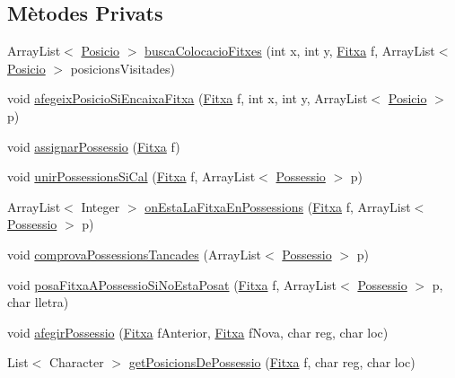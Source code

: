 \subsection*{Mètodes Privats}
\begin{DoxyCompactItemize}
\item 
Array\+List$<$ \mbox{\hyperlink{class_posicio}{Posicio}} $>$ \mbox{\hyperlink{class_tauler_a80439ab819e497bca329ee0ac1b0f298}{busca\+Colocacio\+Fitxes}} (int x, int y, \mbox{\hyperlink{class_fitxa}{Fitxa}} f, Array\+List$<$ \mbox{\hyperlink{class_posicio}{Posicio}} $>$ posicions\+Visitades)
\item 
void \mbox{\hyperlink{class_tauler_ab373a984846631d85aaab3bee1da1781}{afegeix\+Posicio\+Si\+Encaixa\+Fitxa}} (\mbox{\hyperlink{class_fitxa}{Fitxa}} f, int x, int y, Array\+List$<$ \mbox{\hyperlink{class_posicio}{Posicio}} $>$ p)
\item 
void \mbox{\hyperlink{class_tauler_af7c318026f6fb05db78e0b1ed2e8d3b6}{assignar\+Possessio}} (\mbox{\hyperlink{class_fitxa}{Fitxa}} f)
\item 
void \mbox{\hyperlink{class_tauler_acc18f6c54b9a7c0748a20a2090c76252}{unir\+Possessions\+Si\+Cal}} (\mbox{\hyperlink{class_fitxa}{Fitxa}} f, Array\+List$<$ \mbox{\hyperlink{class_possessio}{Possessio}} $>$ p)
\item 
Array\+List$<$ Integer $>$ \mbox{\hyperlink{class_tauler_a6281d6d8601653fa74119e9eac3103a2}{on\+Esta\+La\+Fitxa\+En\+Possessions}} (\mbox{\hyperlink{class_fitxa}{Fitxa}} f, Array\+List$<$ \mbox{\hyperlink{class_possessio}{Possessio}} $>$ p)
\item 
void \mbox{\hyperlink{class_tauler_a24ec7ef9cbe3edc9d0dbb67d4e87245b}{comprova\+Possessions\+Tancades}} (Array\+List$<$ \mbox{\hyperlink{class_possessio}{Possessio}} $>$ p)
\item 
void \mbox{\hyperlink{class_tauler_ac33b81e0bbd22c04fa99fdc47e72f79e}{posa\+Fitxa\+A\+Possessio\+Si\+No\+Esta\+Posat}} (\mbox{\hyperlink{class_fitxa}{Fitxa}} f, Array\+List$<$ \mbox{\hyperlink{class_possessio}{Possessio}} $>$ p, char lletra)
\item 
void \mbox{\hyperlink{class_tauler_a56f985c8ada16eecb5aca521ced42612}{afegir\+Possessio}} (\mbox{\hyperlink{class_fitxa}{Fitxa}} f\+Anterior, \mbox{\hyperlink{class_fitxa}{Fitxa}} f\+Nova, char reg, char loc)
\item 
List$<$ Character $>$ \mbox{\hyperlink{class_tauler_af80e16c20bca52f2717be44a6242193e}{get\+Posicions\+De\+Possessio}} (\mbox{\hyperlink{class_fitxa}{Fitxa}} f, char reg, char loc)
\item 

\end{DoxyCompactItemize}
